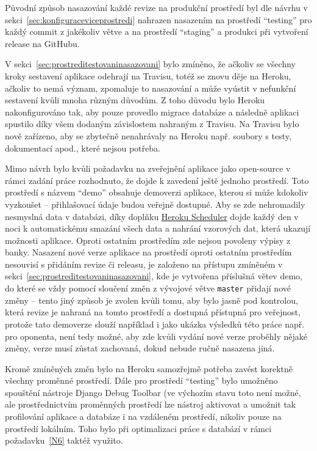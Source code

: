 Původní způsob nasazování každé revize na produkční prostředí byl dle návrhu v sekci~\ref{sec:konfiguraceviceprostredi} nahrazen nasazením na prostředí \enquote{testing} pro každý commit z jakékoliv větve a na prostředí \enquote{staging} a produkci při vytvoření release na GitHubu.

V sekci~\ref{sec:prostreditestovaninasazovani} bylo zmíněno, že ačkoliv se všechny kroky sestavení aplikace odehrají na Travisu, totéž se znovu děje na Heroku, ačkoliv to nemá význam, zpomaluje to nasazování a může vyústit v nefunkční sestavení kvůli mnoha různým důvodům. Z toho důvodu bylo Heroku nakonfigurováno tak, aby pouze provedlo migrace databáze a následně aplikaci spustilo díky všem dodaným závislostem nahraným z Travisu. Na Travisu bylo nově zařízeno, aby se zbytečně nenahrávaly na Heroku např. soubory s testy, dokumentací apod., které nejsou potřeba.

Mimo návrh bylo kvůli požadavku na zveřejnění aplikace jako open-source v rámci zadání práce rozhodnuto, že dojde k zavedení ještě jednoho prostředí. Toto prostředí s názvem \enquote{demo} obsahuje demoverzi aplikace, kterou si může kdokoliv vyzkoušet -- přihlašovací údaje budou veřejně dostupné. Aby se zde nehromadily nesmyslná data v databázi, díky doplňku \href{https://devcenter.heroku.com/articles/scheduler}{Heroku Scheduler} dojde každý den v noci k automatickému smazání všech data a nahrání vzorových dat, která ukazují možnosti aplikace. Oproti ostatním prostředím zde nejsou povoleny výpisy z banky. Nasazení nové verze aplikace na prostředí oproti ostatním prostředím nesouvisí s přidáním revize či releasu, je založeno na přístupu zmíněném v sekci~\ref{sec:prostreditestovaninasazovani}, kde je vytvořena příslušná větev demo, do které se vždy pomocí sloučení změn z vývojové větve \verb|master| přidají nové změny -- tento jiný způsob je zvolen kvůli tomu, aby bylo jasně pod kontrolou, která revize je nahraná na tomto prostředí a dostupná přístupná pro veřejnost, protože tato demoverze slouží například i jako ukázka výsledků této práce např. pro oponenta, není tedy možné, aby zde kvůli vydání nové verze proběhly nějaké změny, verze musí zůstat zachovaná, dokud nebude ručně nasazena jiná.

Kromě zmíněných změn bylo na Heroku samozřejmě potřeba zavést korektně všechny proměnné prostředí. Dále pro prostředí \enquote{testing} bylo umožněno spouštění nástroje Django Debug Toolbar (ve výchozím stavu toto není možné, ale prostřednictvím proměnných prostředí lze nástroj aktivovat a umožnit tak profilování aplikace a databáze i na vzdáleném prostředí, nikoliv pouze na prostředí lokálním. Toho bylo při optimalizaci práce s databází v rámci požadavku~\ref{N6} taktéž využito.

